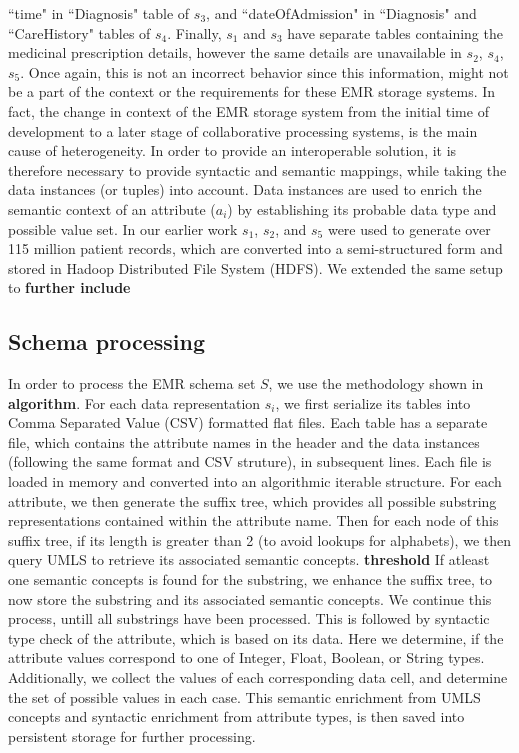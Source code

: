 ``time" in ``Diagnosis" table of $s_3$, and  ``dateOfAdmission" in ``Diagnosis" and ``CareHistory" tables of $s_4$.
Finally, $s_1$ and $s_3$ have separate tables containing the medicinal prescription details, however the same details are unavailable in $s_2$, $s_4$, $s_5$. Once again, this is not an incorrect behavior since this information, might not be a part of the context or the requirements for these EMR storage systems.
In fact, the change in context of the EMR storage system from the initial time of development to a later stage of collaborative processing systems, is the main cause of heterogeneity.
In order to provide an interoperable solution, it is therefore necessary to provide syntactic and semantic mappings, while taking the data instances (or tuples) into account. Data instances are used to enrich the semantic context of an attribute ($a_i$) by establishing its probable data type and possible value set. 
In our earlier work \cite{Satti2020} $s_1$, $s_2$, and $s_5$ were used to generate over 115 million patient records, which are converted into a semi-structured form and stored in Hadoop Distributed File System (HDFS). We extended the same setup to \textbf{further include}

\subsection*{Schema processing}
\label{schema_prepro}

In order to process the EMR schema set $S$, we use the methodology shown in \textbf{algorithm}. For each data representation $s_i$, we first serialize its tables into Comma Separated Value (CSV) formatted flat files. Each table has a separate file, which contains the attribute names in the header and the data instances (following the same format and CSV struture), in subsequent lines. Each file is loaded in memory and converted into an algorithmic iterable structure. For each attribute, we then generate the suffix tree, which provides all possible substring representations contained within the attribute name. Then for each node of this suffix tree, if its length is greater than 2 (to avoid lookups for alphabets), we then query UMLS to retrieve its associated semantic concepts. \textbf{threshold}
If atleast one semantic concepts is found for the substring, we enhance the suffix tree, to now store the substring and its associated semantic concepts. We continue this process, untill all substrings have been processed. This is followed by syntactic type check of the attribute, which is based on its data. Here we determine, if the attribute values correspond to one of Integer, Float, Boolean, or String types. Additionally, we collect the values of each corresponding data cell, and determine the set of possible values in each case. 
This semantic enrichment from UMLS concepts and syntactic enrichment from attribute types, is then saved into persistent storage for further processing. 


